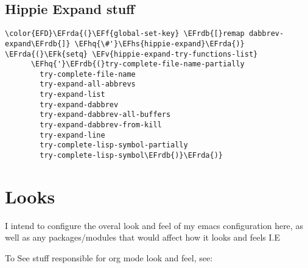 \documentclass{article}
\newcommand{\EFk}[1]{\textcolor{EFk}{#1}} %
\newcommand{\EFf}[1]{\textcolor{EFf}{#1}} %
\newcommand{\EFv}[1]{\textcolor{EFv}{#1}} %
\newcommand{\EFhq}[1]{#1} %
\newcommand{\EFhs}[1]{\textcolor{EFhs}{#1}} %
\newcommand{\EFrda}[1]{\textcolor{EFrda}{#1}} %
\newcommand{\EFrdb}[1]{\textcolor{EFrdb}{#1}} %
\begin{document}
\subsection{Hippie Expand stuff}
\label{sec:orgcc74394}
\begin{Code}
\begin{Verbatim}
\color{EFD}\EFrda{(}\EFf{global-set-key} \EFrdb{[}remap dabbrev-expand\EFrdb{]} \EFhq{\#'}\EFhs{hippie-expand}\EFrda{)}
\EFrda{(}\EFk{setq} \EFv{hippie-expand-try-functions-list}
      \EFhq{'}\EFrdb{(}try-complete-file-name-partially
        try-complete-file-name
        try-expand-all-abbrevs
        try-expand-list
        try-expand-dabbrev
        try-expand-dabbrev-all-buffers
        try-expand-dabbrev-from-kill
        try-expand-line
        try-complete-lisp-symbol-partially
        try-complete-lisp-symbol\EFrdb{)}\EFrda{)}
\end{Verbatim}
\end{Code}

\section{Looks}
\label{sec:orgddf0eb8}
I intend to configure the overal look and feel of my emacs configuration here, as well as any packages/modules that would affect how it looks and feels
I.E

To See stuff responsible for org mode look and feel, see:
\end{document}
